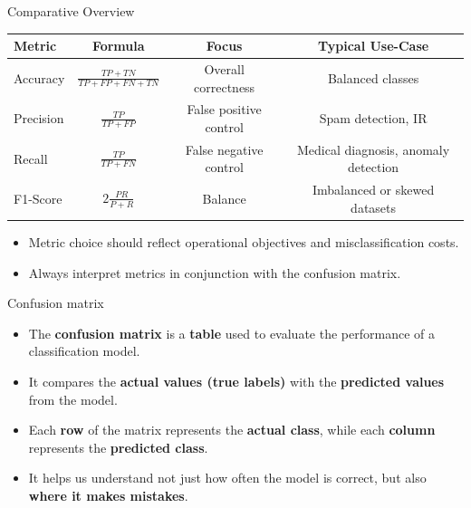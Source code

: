 \documentclass[serif, aspectratio=169]{beamer}
\begin{document}
\begin{frame}{Comparative Overview}
    \begin{center}
    \begin{tabular}{lccc}
        \toprule
        Metric & Formula & Focus & Typical Use-Case \\
        \midrule
        Accuracy & $\frac{TP+TN}{TP+FP+FN+TN}$ & Overall correctness & Balanced classes \\
        Precision & $\frac{TP}{TP+FP}$ & False positive control & Spam detection, IR \\
        Recall & $\frac{TP}{TP+FN}$ & False negative control & Medical diagnosis, anomaly detection \\
        F1-Score & $2\frac{PR}{P+R}$ & Balance & Imbalanced or skewed datasets \\
        \bottomrule
    \end{tabular}
    \end{center}
    \vspace{0.3cm}
    \begin{itemize}
        \item Metric choice should reflect operational objectives and misclassification costs.
        \item Always interpret metrics in conjunction with the confusion matrix.
    \end{itemize}
\end{frame}
            

\begin{frame}{Confusion matrix}
    \begin{itemize}
        \item The \textbf{confusion matrix} is a \textbf{table} used to evaluate the performance of a classification model.
        \item It compares the \textbf{actual values (true labels)} with the \textbf{predicted values} from the model.
        \item Each \textbf{row} of the matrix represents the \textbf{actual class}, while each \textbf{column} represents the \textbf{predicted class}.
        \item It helps us understand not just how often the model is correct, but also \textbf{where it makes mistakes}.
    \end{itemize}
    
\end{frame}
\end{document}
